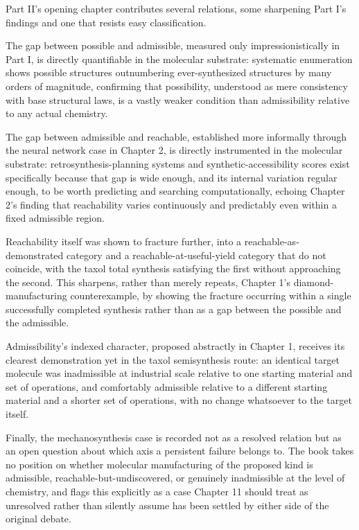 \documentclass[11pt]{book}
\begin{document}
Part II's opening chapter contributes several relations, some sharpening Part I's findings and one that resists easy classification.

The gap between possible and admissible, measured only impressionistically in Part I, is directly quantifiable in the molecular substrate: systematic enumeration shows possible structures outnumbering ever-synthesized structures by many orders of magnitude, confirming that possibility, understood as mere consistency with base structural laws, is a vastly weaker condition than admissibility relative to any actual chemistry.

The gap between admissible and reachable, established more informally through the neural network case in Chapter 2, is directly instrumented in the molecular substrate: retrosynthesis-planning systems and synthetic-accessibility scores exist specifically because that gap is wide enough, and its internal variation regular enough, to be worth predicting and searching computationally, echoing Chapter 2's finding that reachability varies continuously and predictably even within a fixed admissible region.

Reachability itself was shown to fracture further, into a reachable-as-demonstrated category and a reachable-at-useful-yield category that do not coincide, with the taxol total synthesis satisfying the first without approaching the second. This sharpens, rather than merely repeats, Chapter 1's diamond-manufacturing counterexample, by showing the fracture occurring within a single successfully completed synthesis rather than as a gap between the possible and the admissible.

Admissibility's indexed character, proposed abstractly in Chapter 1, receives its clearest demonstration yet in the taxol semisynthesis route: an identical target molecule was inadmissible at industrial scale relative to one starting material and set of operations, and comfortably admissible relative to a different starting material and a shorter set of operations, with no change whatsoever to the target itself.

Finally, the mechanosynthesis case is recorded not as a resolved relation but as an open question about which axis a persistent failure belongs to. The book takes no position on whether molecular manufacturing of the proposed kind is admissible, reachable-but-undiscovered, or genuinely inadmissible at the level of chemistry, and flags this explicitly as a case Chapter 11 should treat as unresolved rather than silently assume has been settled by either side of the original debate.
\end{document}
